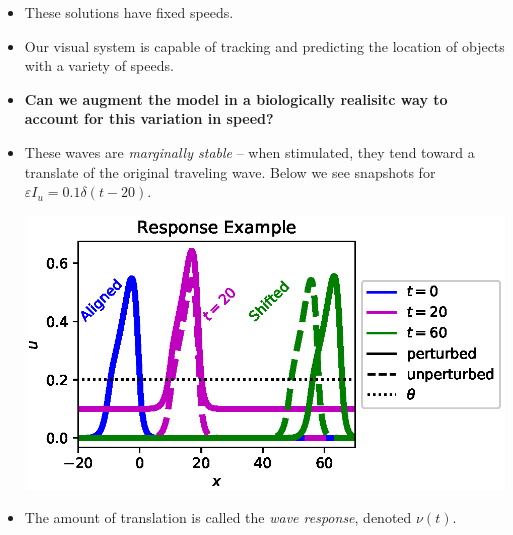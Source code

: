 \documentclass[landscape,final]{baposter}
\begin{document}
\begin{poster}
{
	\begin{itemize}
	\item These solutions have fixed speeds.
	\item Our visual system is capable of tracking and predicting the location of objects with a variety of speeds.
	\item \textbf{Can we augment the model in a biologically realisitc way to account for this variation in speed?}
	\item These waves are \textit{marginally stable} -- when stimulated, they tend toward a translate of the original traveling wave. Below we see snapshots for $\varepsilon I_u = 0.1 \delta(t - 20)$.
	\begin{center}
		\includegraphics[width=.9\linewidth, trim={0cm, .6cm, 0cm, .4cm}, clip=true]{response_example}
	\end{center}
	\item The amount of translation is called the \textit{wave response}, denoted $\nu(t)$.
	\end{itemize}
	\vspace{.2cm}
}


\end{poster}
\end{document}
